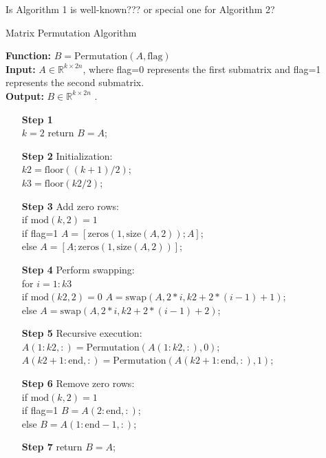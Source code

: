 \documentclass[preprint,12pt]{elsarticle}
\numberwithin{equation}{section}
\begin{document}
{\color{red} Is Algorithm 1 is well-known??? or special one for Algorithm 2?}

\begin{algorithm}[H]
        \caption{Matrix Permutation Algorithm} \label{alg:Permutation}
        \textbf{Function:} $B=\text{Permutation}(A,\text{flag})$\\	
        \textbf{Input:}  $ A \in \mathbb{R}^{k \times 2n}$, where flag=0 represents the first submatrix and flag=1 represents the second submatrix.\\
        \textbf{Output:} $B \in \mathbb{R}^{k \times 2n}$ .
    \begin{itemize}
        \item[\textbf{Step 1}]\\
             $k=2$ \quad return $B=A$;
        \item[\textbf{Step 2}] Initialization:\\
            $k2 = \text{floor}((k+1)/2)$;\\
            $k3 = \text{floor}(k2/2)$;
        \item[\textbf{Step 3}] Add zero rows:\\
            if $\text{mod}(k, 2)=1$ \\
            if flag=1 \quad $A = [\text{zeros}(1, \text{size}(A, 2)); A]$;\\
            else  $A = [A; \text{zeros}(1, \text{size}(A, 2))]$;
        \item[\textbf{Step 4}] Perform swapping:\\
           for $i=1:k3$\\
           if $\text{mod}(k2, 2)=0$ \quad
            $A= \text{swap}(A,2*i,k2+2*(i-1)+1)$;\\
           else
            $A= \text{swap}(A,2*i,k2+2*(i-1)+2)$;
        \item[\textbf{Step 5}] Recursive execution:\\
           $A(1:k2, :) = \text{Permutation}(A(1:k2, :), 0)$;\\
           $A(k2+1:\text{end}, :) = \text{Permutation}(A(k2+1:\text{end}, :), 1)$;
        \item[\textbf{Step 6}] Remove zero rows: \\
           if $\text{mod}(k, 2)=1$ \\
           if flag=1 \quad $B = A(2:\text{end}, :)$;\\
           else $B = A(1:\text{end}-1, :)$;
        \item[\textbf{Step 7}] return $B=A$;
    \end{itemize}
\end{algorithm}
\end{document}
